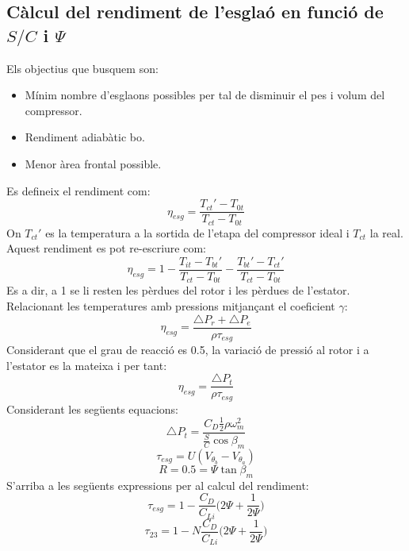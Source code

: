 \subsection{Càlcul del rendiment de l'esglaó en funció de $S/C$ i $\Psi$}
Els objectius que busquem son: 
\begin{itemize}
\item Mínim nombre d'esglaons possibles per tal de disminuir el pes i volum del compressor.
\item Rendiment adiabàtic bo.
\item Menor àrea frontal possible.
\end{itemize}
Es defineix el rendiment com:
\begin{equation}
\eta_{esg}=\frac{T_{ct}'-T_{0t}}{T_{ct}-T_{0t}}
\end{equation}
On $T_{ct}'$ es la temperatura a la sortida de l'etapa del compressor ideal i $T_{ct}$ la real. Aquest rendiment es pot re-escriure com:
\begin{equation}
\eta_{esg}=1-\frac{T_{it}-T_{bt}'}{T_{ct}-T_{0t}}-\frac{T_{bt}'-T_{ct}'}{T_{ct}-T_{0t}}
\end{equation}
Es a dir, a 1 se li resten les pèrdues del rotor i les pèrdues de l'estator. Relacionant les temperatures amb pressions mitjançant el coeficient $\gamma$:
\begin{equation}
\eta_{esg}=\frac{\bigtriangleup P_{r}+\bigtriangleup P_{e}}{\rho\tau_{esg}}
\end{equation}
Considerant que el grau de reacció es 0.5, la variació de pressió al rotor i a l'estator es la mateixa i per tant: 
\begin{equation}
\eta_{esg}=\frac{\bigtriangleup P_t}{\rho\tau_{esg}}
\end{equation}
Considerant les següents equacions: 
\begin{equation}
\bigtriangleup P_t=\frac{C_D\frac{1}{2}\rho\omega_m^2}{\frac{S}{C}\cos\beta_m}
\end{equation}
\begin{equation}
\tau_{esg}=U(V_{\theta_b}-V_{\theta_a})
\end{equation}
\begin{equation}
R=0.5=\Psi\tan\beta_m
\end{equation}
S'arriba a les següents expressions per al calcul del rendiment: 
\begin{equation}
\tau_{esg}=1-\frac{C_D}{C_{Li}}\Big( 2\Psi+\frac{1}{2\Psi}\Big)
\end{equation}
\begin{equation}
\tau_{23}=1-N\frac{C_D}{C_{Li}}\Big( 2\Psi+\frac{1}{2\Psi}\Big)
\end{equation}
